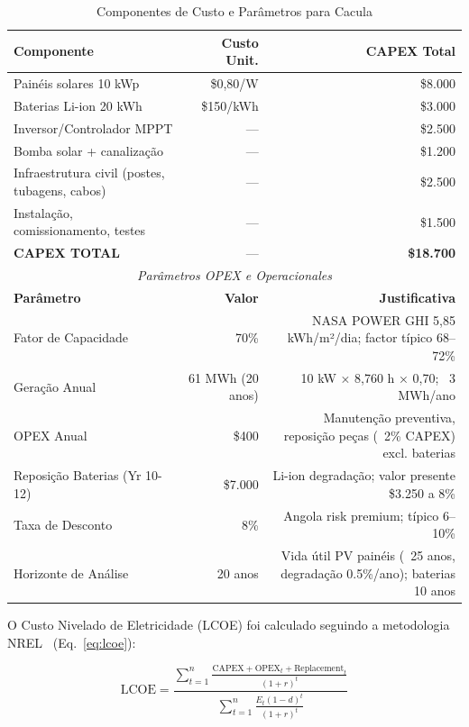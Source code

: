 \documentclass[12pt, a4paper]{article}
\begin{document}
\begin{itemize}
\begin{table}[H]
\centering
\caption{Componentes de Custo e Parâmetros para Cacula}
\label{tab:cacula_lcoe}
\small
\begin{tabular}{|l|r|r|}
\hline
\textbf{Componente} & \textbf{Custo Unit.} & \textbf{CAPEX Total} \\
\hline
Painéis solares 10 kWp & \$0,80/W & \$8.000 \\
Baterias Li-ion 20 kWh & \$150/kWh & \$3.000 \\
Inversor/Controlador MPPT & --- & \$2.500 \\
Bomba solar + canalização & --- & \$1.200 \\
Infraestrutura civil (postes, tubagens, cabos) & --- & \$2.500 \\
Instalação, comissionamento, testes & --- & \$1.500 \\
\hline
\textbf{CAPEX TOTAL} & --- & \textbf{\$18.700} \\
\hline
\multicolumn{3}{c}{\textit{Parâmetros OPEX e Operacionales}} \\
\hline
\textbf{Parâmetro} & \textbf{Valor} & \textbf{Justificativa} \\
\hline
Fator de Capacidade & 70\% & NASA POWER GHI 5,85 kWh/m²/dia; factor típico 68–72\% \\
Geração Anual & 61 MWh (20 anos) & 10 kW × 8,760 h × 0,70; ~3 MWh/ano \\
OPEX Anual & \$400 & Manutenção preventiva, reposição peças (~2\% CAPEX) excl. baterias \\
Reposição Baterias (Yr 10-12) & \$7.000 & Li-ion degradação; valor presente ~\$3.250 a 8\% \\
Taxa de Desconto & 8\% & Angola risk premium; típico 6–10\% \\
Horizonte de Análise & 20 anos & Vida útil PV painéis (~25 anos, degradação 0.5\%/ano); baterias ~10 anos \\
\hline
\end{tabular}
\end{table}

O Custo Nivelado de Eletricidade (LCOE) foi calculado seguindo a metodologia NREL~\citep{NREL2020} (Eq.~\ref{eq:lcoe}):

\begin{equation}
\label{eq:lcoe}
\text{LCOE} = \frac{\sum_{t=1}^{n} \frac{\text{CAPEX} + \text{OPEX}_t + \text{Replacement}_t}{(1+r)^t}}{\sum_{t=1}^{n} \frac{E_t(1-d)^t}{(1+r)^t}}
\end{equation}


\end{itemize}
\end{document}
